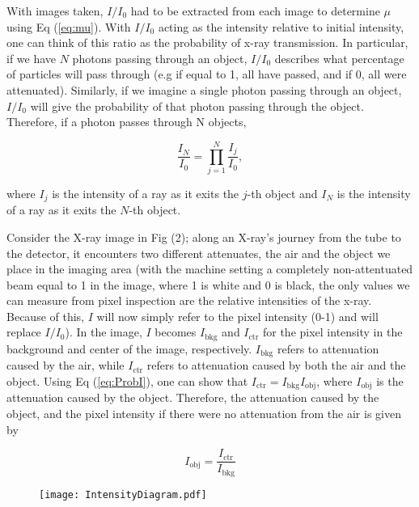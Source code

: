 With images taken, $I/I_0$ had to be extracted from each image to determine $\mu$ using Eq (\ref{eq:mu}). With $I/I_0$ acting as the intensity relative to initial intensity, one can think of this ratio as the probability of x-ray transmission. In particular, if we have $N$ photons passing through an object, $I/I_0$ describes what percentage of particles will pass through (e.g if equal to 1, all have passed, and if 0, all were attenuated). Similarly, if we imagine a single photon passing through an object, $I/I_0$ will give the probability of that photon passing through the object. Therefore, if a photon passes through N objects, 

\begin{equation}
    \frac{I_N}{I_0} = \prod_{j=1}^{N} \frac{I_j}{I_0},
\label{eq:ProbI}
\end{equation}

where $I_j$ is the intensity of a ray as it exits the $j$-th object and $I_N$ is the intensity of a ray as it exits the $N$-th object.

Consider the X-ray image in Fig (2); along an X-ray's journey from the tube to the detector, it encounters two different attenuates, the air and the object we place in the imaging area (with the machine setting a completely non-attentuated beam equal to 1 in the image, where 1 is white and 0 is black, the only values we can measure from pixel inspection are the relative intensities of the x-ray. Because of this, $I$ will now simply refer to the pixel intensity (0-1) and will replace $I/I_0$). In the image, $I$ becomes $I_{\text{bkg}}$ and $I_{\text{ctr}}$ for the pixel intensity in the background and center of the image, respectively. $I_{\text{bkg}}$ refers to attenuation caused by the air, while $I_{\text{ctr}}$ refers to attenuation caused by both the air and the object. Using Eq (\ref{eq:ProbI}), one can show that $I_{\text{ctr}} = I_{\text{bkg}} I_{\text{obj}}$, where $I_{\text{obj}}$ is the attenuation caused by the object. Therefore, the attenuation caused by the object, and the pixel intensity if there were no attenuation from the air is given by

\begin{equation}
    I_{\text{obj}} = \frac{I_{\text{ctr}}}{I_{\text{bkg}}}
\label{eq:IObj}
\end{equation}

\begin{figure}[H]
    \centering
	\texttt{[image: IntensityDiagram.pdf]}
	\label{fig::IntensityDiagram}
	\caption{}
\end{figure}